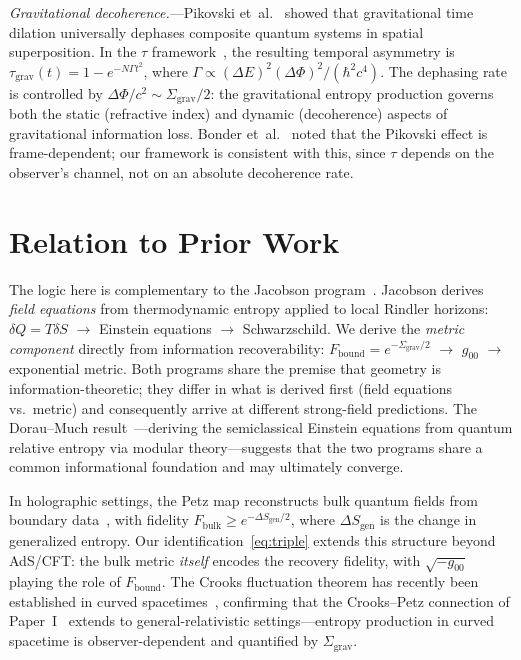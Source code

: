 \documentclass[prl,twocolumn,superscriptaddress,floatfix,nofootinbib]{revtex4-2}
\newcommand{\tauasym}{\tau}
\newcommand{\Sgrav}{\Sigma_{\mathrm{grav}}}
\newcommand{\Fbound}{F_{\mathrm{bound}}}
\begin{document}
\emph{Gravitational decoherence.}---Pikovski
et~al.~\cite{Pikovski2015} showed that gravitational time
dilation universally dephases composite quantum systems in
spatial superposition.
In the $\tauasym$ framework~\cite{Huang2026}, the resulting
temporal asymmetry is $\tauasym_{\mathrm{grav}}(t)
= 1 - e^{-N\Gamma t^2}$, where $\Gamma \propto
(\Delta E)^2(\Delta\Phi)^2/(\hbar^2 c^4)$.
The dephasing rate is controlled by
$\Delta\Phi/c^2 \sim \Sgrav/2$: the gravitational entropy
production governs both the static (refractive index)
and dynamic (decoherence) aspects of gravitational
information loss.
Bonder et~al.~\cite{Bonder2015} noted that the Pikovski
effect is frame-dependent; our framework is consistent
with this, since $\tauasym$ depends on the observer's
channel, not on an absolute decoherence rate.

\section{Relation to Prior Work}
\label{sec:prior}

The logic here is complementary to the Jacobson
program~\cite{Jacobson1995}.
Jacobson derives \emph{field equations} from
thermodynamic entropy applied to local Rindler horizons:
$\delta Q = T\delta S$ $\to$ Einstein equations $\to$
Schwarzschild.
We derive the \emph{metric component} directly from
information recoverability:
$\Fbound = e^{-\Sgrav/2}$ $\to$ $g_{00}$ $\to$
exponential metric.
Both programs share the premise that geometry is
information-theoretic; they differ in what is derived
first (field equations vs.\ metric) and consequently
arrive at different strong-field predictions.
The Dorau--Much result~\cite{DorauMuch2025}---deriving
the semiclassical Einstein equations from quantum
relative entropy via modular theory---suggests that the
two programs share a common informational foundation and
may ultimately converge.

In holographic settings, the Petz map reconstructs bulk
quantum fields from boundary data~\cite{Cotler2019}, with
fidelity $F_{\text{bulk}} \geq e^{-\Delta S_{\text{gen}}/2}$,
where $\Delta S_{\text{gen}}$ is the change in generalized
entropy.
Our identification~\eqref{eq:triple} extends this
structure beyond AdS/CFT: the bulk metric
\emph{itself} encodes the recovery fidelity, with
$\sqrt{-g_{00}}$ playing the role of $\Fbound$.
The Crooks fluctuation theorem has recently been
established in curved spacetimes~\cite{BassoCeleri2025},
confirming that the Crooks--Petz connection of
Paper~I~\cite{Huang2026} extends to general-relativistic
settings---entropy production in curved spacetime is
observer-dependent and quantified by $\Sgrav$.
\end{document}
